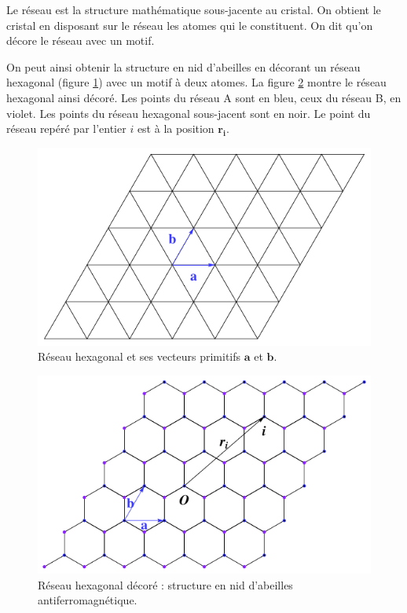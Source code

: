 \documentclass[a4paper, french]{report}
\newcommand{\pos}[1]{\ensuremath{\mathbf{r_{#1}}}\xspace}
\newcommand{\1}{\ensuremath{\ket{\om_1\bom_1}}\xspace}
\newcommand{\2}{\ensuremath{\ket{\om_2\bom_2}}\xspace}
\begin{document}
Le réseau est la structure mathématique sous-jacente au cristal. On obtient le cristal en disposant sur le réseau les atomes qui le constituent. On dit qu'on décore le réseau avec un motif.

On peut ainsi obtenir la structure en nid d'abeilles en décorant un réseau hexagonal (figure \ref{fig:hexa}) avec un motif à deux atomes. La figure \ref{fig:all} montre le réseau hexagonal ainsi décoré. Les points du réseau A sont en bleu, ceux du réseau B, en violet. Les points du réseau hexagonal sous-jacent sont en noir. Le point du réseau repéré par l'entier $i$ est à la position \pos{i}.

\begin{figure}[htp]
\centering
\includegraphics[scale=1.80]{vector_img/vect_prim_hexa.pdf}
\caption{Réseau hexagonal et ses vecteurs primitifs $\mathbf{a}$ et $\mathbf{b}$.}
\label{fig:hexa}
\end{figure}

\begin{figure}[htp]
\centering
\includegraphics[scale=1.80]{vector_img/structure_nid_abeilles.pdf}
\caption{Réseau hexagonal décoré : structure en nid d'abeilles antiferromagnétique.}
\label{fig:all}
\end{figure}
\end{document}
